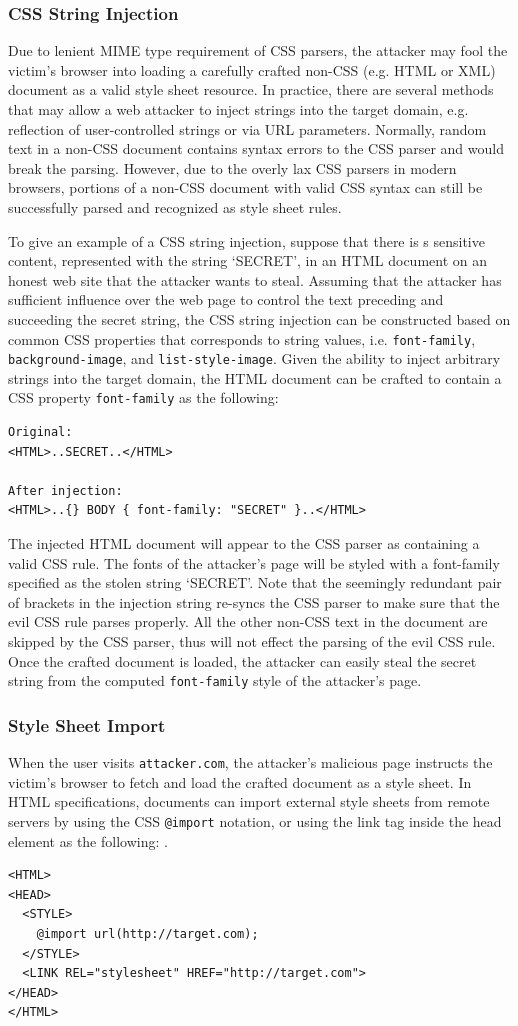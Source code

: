 \documentclass{acm_proc_article-sp}
\begin{document}
{\subsubsection{CSS String Injection}
Due to lenient MIME type requirement of CSS parsers, the attacker may fool the victim's browser into loading a carefully crafted non-CSS (e.g. HTML or XML) document as a valid style sheet resource. In practice, there are several methods that may allow a web attacker to inject strings into the target domain, e.g. reflection of user-controlled strings or via URL parameters. Normally, random text in a non-CSS document contains syntax errors to the CSS parser and would break the parsing. However, due to the overly lax CSS parsers in modern browsers, portions of a non-CSS document with valid CSS syntax can still be successfully parsed and recognized as style sheet rules.

To give an example of a CSS string injection, suppose that there is s sensitive content, represented with the string `SECRET', in an HTML document on an honest web site that the attacker wants to steal. Assuming that the attacker has sufficient influence over the web page to control the text preceding and succeeding the secret string, the CSS string injection can be constructed based on common CSS properties that corresponds to string values, i.e. \texttt{font-family}, \texttt{background-image}, and \texttt{list-style-image}. Given the ability to inject arbitrary strings into the target domain, the HTML document can be crafted to contain a CSS property \texttt{font-family} as the following:
\begin{verbatim}
Original:
<HTML>..SECRET..</HTML>

After injection:
<HTML>..{} BODY { font-family: "SECRET" }..</HTML>
\end{verbatim}
The injected HTML document will appear to the CSS parser as containing a valid CSS rule. The fonts of the attacker's page will be styled with a font-family specified as the stolen string `SECRET'. Note that the seemingly redundant pair of brackets in the injection string re-syncs the CSS parser to make sure that the evil CSS rule parses properly. All the other non-CSS text in the document are skipped by the CSS parser, thus will not effect the parsing of the evil CSS rule. Once the crafted document is loaded, the attacker can easily steal the secret string from the computed \texttt{font-family} style of the attacker's page.

\subsubsection{Style Sheet Import}
When the user visits \texttt{attacker.com}, the attacker's malicious page instructs the victim's browser to fetch and load the crafted document as a style sheet. In HTML specifications\cite{html}, documents can import external style sheets from remote servers by using the CSS \texttt{@import} notation, or using the link tag inside the head element as the following: .
\begin{verbatim}
<HTML>
<HEAD>
  <STYLE>
    @import url(http://target.com);
  </STYLE>
  <LINK REL="stylesheet" HREF="http://target.com">
</HEAD>
</HTML>
\end{verbatim}
}
\end{document}
